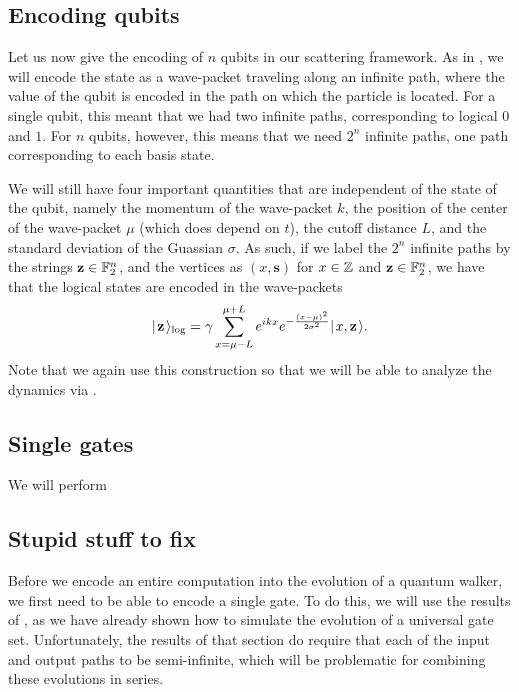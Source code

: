 \documentclass[../thesis-main/thesis-main]{subfiles}
\begin{document}
\subsection{Encoding qubits}\label{sec:multi_qubit_encoding}

Let us now give the encoding of $n$ qubits in our scattering framework.  As in , we will encode the state as a wave-packet traveling along an infinite path, where the value of the qubit is encoded in the path on which the particle is located.  For a single qubit, this meant that we had two infinite paths, corresponding to logical $0$ and $1$.  For $n$ qubits, however, this means that we need $2^n$ infinite paths, one path corresponding to each basis state.

We will still have four important quantities that are independent of the state of the qubit, namely the momentum of the wave-packet $k$, the position of the center of the wave-packet $\mu$ (which does depend on $t$), the cutoff distance $L$, and the standard deviation of the Guassian $\sigma$.  As such, if we label the $2^n$ infinite paths by the strings $\mathbf{z}\in \mathbb{F}_2^n$, and the vertices as $(x,\mathbf{s})$ for $x\in \mathbb{Z}$ and $\mathbf{z}\in \mathbb{F}_2^n$, we have that the logical states are encoded in the wave-packets
\begin{align}
  |\mspace{2mu} \mathbf{z} \mspace{2mu} \rangle_{\text{log}} = \gamma \sum_{x = \mu - L}^{\mu + L} e^{ i k x} e^{ - \frac{(x-\mu)^2}{2\sigma^2}} |\mspace{2mu} x,\mathbf{z} \mspace{2mu} \rangle \label{eq:multi_qubit_encoding}.
\end{align}
Note that we again use this construction so that we will be able to analyze the dynamics via .


\subsection{Single gates}

We will perform 
  
\subsection{Stupid stuff to fix}

Before we encode an entire computation into the evolution of a quantum walker, we first need to be able to encode a single gate.  To do this, we will use the results of , as we have already shown how to simulate the evolution of a universal gate set.  Unfortunately, the results of that section do require that each of the input and output paths to be semi-infinite, which will be problematic for combining these evolutions in series.
\end{document}
